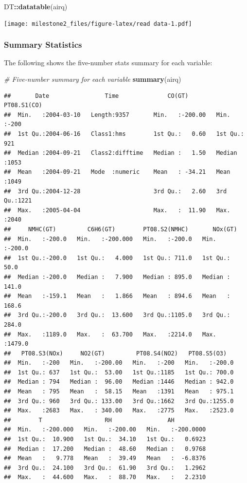 \documentclass[]{article}
\newenvironment{Shaded}{\begin{snugshade}}{\end{snugshade}}
\newcommand{\CommentTok}[1]{\textcolor[rgb]{0.56,0.35,0.01}{\textit{#1}}}
\newcommand{\KeywordTok}[1]{\textcolor[rgb]{0.13,0.29,0.53}{\textbf{#1}}}
\newcommand{\NormalTok}[1]{#1}
\newcommand{\OperatorTok}[1]{\textcolor[rgb]{0.81,0.36,0.00}{\textbf{#1}}}
\begin{document}
\begin{Shaded}
\begin{Highlighting}[]
\NormalTok{DT}\OperatorTok{::}\KeywordTok{datatable}\NormalTok{(airq)}
\end{Highlighting}
\end{Shaded}

\texttt{[image: milestone2\_files/figure-latex/read data-1.pdf]}

\hypertarget{summary-statistics}{%
\subsubsection{Summary Statistics}\label{summary-statistics}}

The following shows the five-number stats summary for each variable:

\begin{Shaded}
\begin{Highlighting}[]
\CommentTok{# Five-number summary for each variable}
\KeywordTok{summary}\NormalTok{(airq)}
\end{Highlighting}
\end{Shaded}

\begin{verbatim}
##       Date                Time              CO(GT)         PT08.S1(CO)  
##  Min.   :2004-03-10   Length:9357       Min.   :-200.00   Min.   :-200  
##  1st Qu.:2004-06-16   Class1:hms        1st Qu.:   0.60   1st Qu.: 921  
##  Median :2004-09-21   Class2:difftime   Median :   1.50   Median :1053  
##  Mean   :2004-09-21   Mode  :numeric    Mean   : -34.21   Mean   :1049  
##  3rd Qu.:2004-12-28                     3rd Qu.:   2.60   3rd Qu.:1221  
##  Max.   :2005-04-04                     Max.   :  11.90   Max.   :2040  
##     NMHC(GT)         C6H6(GT)        PT08.S2(NMHC)       NOx(GT)      
##  Min.   :-200.0   Min.   :-200.000   Min.   :-200.0   Min.   :-200.0  
##  1st Qu.:-200.0   1st Qu.:   4.000   1st Qu.: 711.0   1st Qu.:  50.0  
##  Median :-200.0   Median :   7.900   Median : 895.0   Median : 141.0  
##  Mean   :-159.1   Mean   :   1.866   Mean   : 894.6   Mean   : 168.6  
##  3rd Qu.:-200.0   3rd Qu.:  13.600   3rd Qu.:1105.0   3rd Qu.: 284.0  
##  Max.   :1189.0   Max.   :  63.700   Max.   :2214.0   Max.   :1479.0  
##   PT08.S3(NOx)     NO2(GT)         PT08.S4(NO2)   PT08.S5(O3)    
##  Min.   :-200   Min.   :-200.00   Min.   :-200   Min.   :-200.0  
##  1st Qu.: 637   1st Qu.:  53.00   1st Qu.:1185   1st Qu.: 700.0  
##  Median : 794   Median :  96.00   Median :1446   Median : 942.0  
##  Mean   : 795   Mean   :  58.15   Mean   :1391   Mean   : 975.1  
##  3rd Qu.: 960   3rd Qu.: 133.00   3rd Qu.:1662   3rd Qu.:1255.0  
##  Max.   :2683   Max.   : 340.00   Max.   :2775   Max.   :2523.0  
##        T                  RH                AH           
##  Min.   :-200.000   Min.   :-200.00   Min.   :-200.0000  
##  1st Qu.:  10.900   1st Qu.:  34.10   1st Qu.:   0.6923  
##  Median :  17.200   Median :  48.60   Median :   0.9768  
##  Mean   :   9.778   Mean   :  39.49   Mean   :  -6.8376  
##  3rd Qu.:  24.100   3rd Qu.:  61.90   3rd Qu.:   1.2962  
##  Max.   :  44.600   Max.   :  88.70   Max.   :   2.2310
\end{verbatim}
\end{document}
